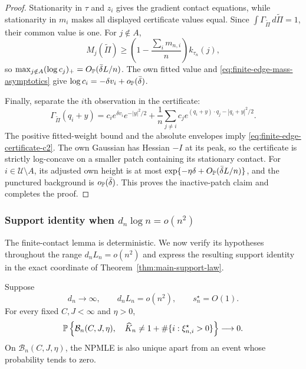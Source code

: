 \begin{proof}
Stationarity in \(\tau\) and \(z_i\) gives the gradient contact equations,
while stationarity in \(m_i\) makes all displayed certificate values
equal.  Since
\(\int\Gamma_{\widetilde\Pi}\,d\widetilde\Pi=1\), their common value is
one.  For \(j\notin A\),
\[
 M_j(\widetilde\Pi)
 \ge
 \left(1-\frac{\sum_i m_{n,i}}n\right)k_{\tau_n}(j),
\]
so \(\max_{j\notin A}(\log c_j)_+=O_{\mathbb P}(\bar\delta L/n)\).
The own fitted value and
\eqref{eq:finite-edge-mass-asymptotics} give
\(\log c_i=-\delta v_i+o_{\mathbb P}(\bar\delta)\).

Finally, separate the \(i\)th observation in the certificate:
\[
 \Gamma_{\widetilde\Pi}(q_i+y)
 =
 c_i e^{\delta v_i}e^{-|y|^2/2}
 +\frac1n\sum_{j\ne i}c_j
   e^{(q_i+y)\cdot q_j-|q_i+y|^2/2}.
\]
The positive fitted-weight bound and the absolute envelopes imply
\eqref{eq:finite-edge-certificate-c2}.  The own Gaussian has Hessian
\(-I\) at its peak, so the certificate is strictly log-concave on a
smaller patch containing its stationary contact.  For
\(i\in\mathcal U\setminus A\), its adjusted own height is at most
\(\exp\{-\eta\delta+O_{\mathbb P}(\bar\delta L/n)\}\), and the punctured
background is \(o_{\mathbb P}(\bar\delta)\).  This proves the inactive-patch
claim and completes the proof.
\end{proof}

\subsubsection{Support identity when \(d_n\log n=o(n^2)\)}

The finite-contact lemma is deterministic. We now verify its hypotheses
throughout the range \(d_nL_n=o(n^2)\) and express the resulting support
identity in the exact coordinate of Theorem~\ref{thm:main-support-law}.

\begin{proposition}
\label{prop:buffered-support-below-simplex}
Suppose
\[
 d_n\longrightarrow\infty,
 \qquad d_nL_n=o(n^2),
 \qquad s_n^\star=O(1).
\]
For every fixed \(C,J<\infty\) and \(\eta>0\),
\begin{equation}
\label{eq:buffered-support-below-simplex}
 \mathbb P\left\{
  \mathcal B_n(C,J,\eta),\quad
  \widehat K_n\ne1+\#\{i:\xi_{n,i}^\star>0\}
 \right\}\longrightarrow0.
\end{equation}
On \(\mathcal B_n(C,J,\eta)\), the NPMLE is also unique apart from an event
whose probability tends to zero.
\end{proposition}

